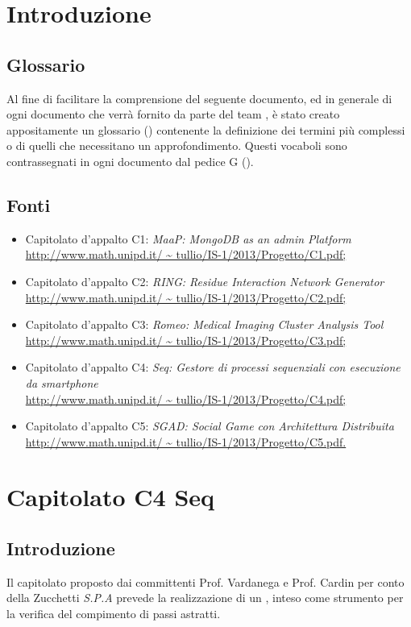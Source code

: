 \section{Introduzione}
\subsection{Glossario}
Al fine di facilitare la comprensione del seguente documento, ed in generale di ogni documento che verrà fornito da parte del team \gruppo , è stato creato appositamente un glossario (\textit{\Glossario}) contenente la definizione dei termini più complessi o di quelli che necessitano un approfondimento. Questi vocaboli sono contrassegnati in ogni documento dal pedice G ().
\subsection{Fonti}
\begin{itemize}
\item Capitolato d'appalto C1:\textit{ MaaP: MongoDB as an admin Platform} \\
\url{http://www.math.unipd.it/ ~ tullio/IS-1/2013/Progetto/C1.pdf;}
\item  Capitolato d'appalto C2: \textit{RING: Residue Interaction Network Generator}\\
\url{http://www.math.unipd.it/ ~ tullio/IS-1/2013/Progetto/C2.pdf;}
\item  Capitolato d'appalto C3: \textit{Romeo: Medical Imaging Cluster Analysis Tool}\\
\url{http://www.math.unipd.it/ ~ tullio/IS-1/2013/Progetto/C3.pdf;}
\item Capitolato d'appalto C4: \textit{Seq: Gestore di processi sequenziali con esecuzione da smartphone}\\
\url{http://www.math.unipd.it/ ~ tullio/IS-1/2013/Progetto/C4.pdf;}
\item Capitolato d'appalto C5:  \textit{SGAD: Social Game con Architettura Distribuita}\\
\url{http://www.math.unipd.it/ ~ tullio/IS-1/2013/Progetto/C5.pdf.}
\end{itemize}
\section{Capitolato C4 Seq}
\subsection{Introduzione}
Il capitolato proposto dai committenti Prof. Vardanega e Prof. Cardin per conto della Zucchetti \textit{S.P.A}  prevede la realizzazione di un \progetto , inteso come strumento per la verifica del compimento di passi astratti.

